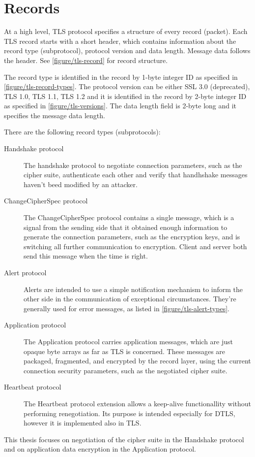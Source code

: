 \section{Records}



At a high level, TLS protocol specifies a structure of every record (packet). Each TLS record starts with a short header, which contains information about the record type (subprotocol), protocol version and data length. Message data follows the header. See \autoref{figure/tls-record} for record structure.

The record type is identified in the record by 1-byte integer ID as specified in \autoref{figure/tls-record-types}. The protocol version can be either SSL 3.0 (deprecated), TLS 1.0, TLS 1.1, TLS 1.2 and it is identified in the record by 2-byte integer ID as specified in \autoref{figure/tls-versions}. The data length field is 2-byte long and it specifies the message data length.

There are the following record types (subprotocols):

\begin{description}
  \item[Handshake protocol] The handshake protocol to negotiate connection parameters, such as the cipher suite, authenticate each other and verify that handhshake messages haven't beed modified by an attacker.
  \item[ChangeCipherSpec protocol] The ChangeCipherSpec protocol contains a single message, which is a signal from the sending side that it obtained enough information to generate the connection parameters, such as the encryption keys, and is switching all further communication to encryption. Client and server both send this message when the time is right.
  \item[Alert protocol] Alerts are intended to use a simple notification mechanism to inform the other side in the communication of exceptional circumstances. They're generally used for error messages, as listed in \autoref{figure/tls-alert-types}.
  \item[Application protocol] The Application protocol carries application messages, which are just opaque byte arrays as far as TLS is concerned. These messages are packaged, fragmented, and encrypted by the record layer, using the current connection security parameters, such as the negotiated cipher suite.
  \item[Heartbeat protocol] The Heartbeat protocol extension allows a keep-alive functionallity without performing renegotiation. Its purpose is intended especially for DTLS, however it is implemented also in TLS.
\end{description}

This thesis focuses on negotiation of the cipher suite in the Handshake protocol and on application data encryption in the Application protocol.
